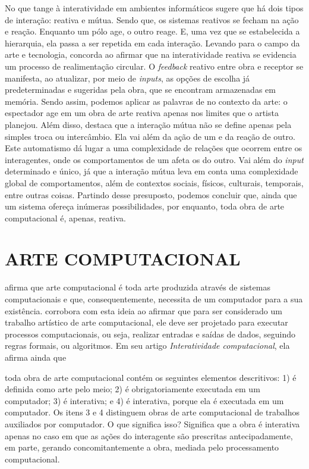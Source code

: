 No que tange à interatividade em ambientes informáticos  sugere que há dois tipos de interação: reativa e mútua. Sendo que,  os sistemas reativos se fecham na ação e reação. Enquanto um pólo age, o outro reage. E, uma vez que se estabelecida a hierarquia, ela passa a ser repetida em cada interação. Levando para o campo da arte e tecnologia,  concorda ao afirmar que na interatividade reativa se evidencia um processo de realimentação circular. O \textit{feedback} reativo entre obra e receptor se manifesta, ao atualizar, por meio de \textit{inputs}, as opções de escolha já predeterminadas e sugeridas pela obra, que se encontram armazenadas em memória. Sendo assim, podemos aplicar as palavras de  no contexto da arte: o espectador age em um obra de arte reativa apenas nos limites que o artista planejou. Além disso,  destaca que a interação mútua não se define apenas pela simples troca ou intercâmbio. Ela vai além da ação de um e da reação de outro. Este automatismo dá lugar a uma complexidade de relações que ocorrem entre os interagentes, onde os comportamentos de um afeta os do outro. Vai além do \textit{input} determinado e único, já que a interação mútua leva em conta uma complexidade global de comportamentos, além de contextos sociais, físicos, culturais, temporais, entre outras coisas. Partindo desse presuposto, podemos concluir que, ainda que um sistema ofereça inúmeras possibilidades, por enquanto, toda obra de arte computacional é, apenas, reativa.


\section{ARTE COMPUTACIONAL}

 afirma que arte computacional é toda arte produzida através de sistemas  computacionais e que, consequentemente, necessita de um computador para a sua existência.  corrobora com esta ideia ao afirmar que para ser considerado um trabalho artístico de arte computacional, ele deve ser projetado para executar processos computacionais, ou seja, realizar entradas e saídas de dados, seguindo regras formais, ou algoritmos. Em seu artigo \textit{Interatividade computacional}, ela afirma ainda que

\begin{citacao}
toda obra de arte computacional contém os seguintes elementos descritivos: 1) é definida como arte pelo meio; 2) é obrigatoriamente executada em um computador; 3) é interativa; e 4) é interativa, porque ela é executada em um computador. Os itens 3 e 4 distinguem obras de arte computacional de trabalhos auxiliados por computador. O que significa isso? Significa que a obra é interativa apenas no caso em que as ações do interagente são prescritas antecipadamente, em parte, gerando concomitantemente a obra, mediada pelo processamento computacional.  \cite[p. 133]{venturelli}
\end{citacao}

